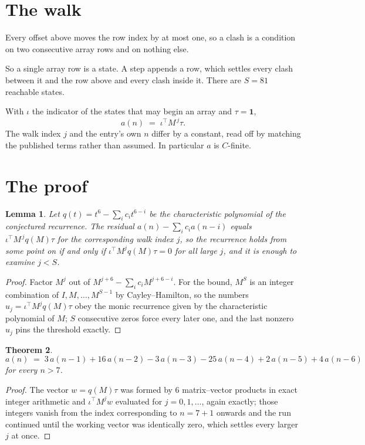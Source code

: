 \documentclass[11pt,a4paper]{article}
\theoremstyle{plain}
\newtheorem{theorem}{Theorem}
\newtheorem{lemma}[theorem]{Lemma}
\theoremstyle{definition}
\begin{document}
\section{The walk}

Every offset above moves the row index by at most one, so a clash is a condition on two
consecutive array rows and on nothing else.

So a single array row is a state. A step appends a row, which settles every clash between it
and the row above and every clash inside it. There are $S=81$ reachable states.

With $\iota$ the indicator of the states that may begin an array and $\tau=\mathbf{1}$,
\[
a(n)\;=\;\iota^{\!\top}M^{\,j}\tau .
\]
The walk index $j$ and the entry's own $n$ differ by a constant, read off by matching the
published terms rather than assumed. In particular $a$ is $C$-finite.

\section{The proof}

\begin{lemma}\label{lem:crit}
Let $q(t)=t^{6}-\sum_i c_it^{6-i}$ be the characteristic polynomial of the
conjectured recurrence. The residual $a(n)-\sum_ic_ia(n-i)$ equals
$\iota^{\!\top}M^{\,j}q(M)\tau$ for the corresponding walk index $j$, so the recurrence
holds from some point on if and only if $\iota^{\!\top}M^{j}q(M)\tau=0$ for all large $j$,
and it is enough to examine $j<S$.
\end{lemma}

\begin{proof}
Factor $M^{j}$ out of $M^{j+6}-\sum_ic_iM^{j+6-i}$. For the bound, $M^{S}$
is an integer combination of $I,M,\dots,M^{S-1}$ by Cayley--Hamilton, so the numbers
$u_j=\iota^{\!\top}M^{j}q(M)\tau$ obey the monic recurrence given by the characteristic
polynomial of $M$; $S$ consecutive zeros force every later one, and the last nonzero $u_j$
pins the threshold exactly.
\end{proof}

\begin{theorem}
\[
a(n)\;=\;3\,a(n-1) + 16\,a(n-2) - 3\,a(n-3) - 25\,a(n-4) + 2\,a(n-5) + 4\,a(n-6)
\]
for every $n>7$.
\end{theorem}

\begin{proof}
The vector $w=q(M)\tau$ was formed by $6$ matrix--vector products in exact integer
arithmetic and $\iota^{\!\top}M^{j}w$ evaluated for $j=0,1,\dots$, again exactly; those
integers vanish from the index corresponding to $n=7+1$ onwards and the run continued
until the working vector was identically zero, which settles every larger $j$ at once.
\end{proof}
\end{document}
